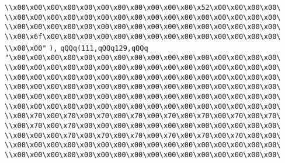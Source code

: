 \verb|\\x00\x00\x00\x00\x00\x00\x00\x00\x00\x00\x00\x52\x00\x00\x00\x00\|\newline
\verb|\\x00\x00\x00\x00\x00\x00\x00\x00\x00\x00\x00\x00\x00\x00\x00\x00\|\newline
\verb|\\x00\x00\x00\x00\x00\x00\x00\x00\x00\x00\x00\x00\x00\x00\x00\x00\|\newline
\verb|\\x00\x6f\x00\x00\x00\x00\x00\x00\x00\x00\x00\x00\x00\x00\x00\x00\|\newline
\verb|\\x00\x00"|\newline
\verb|),|\newline
\verb|qQQq(111,qQQq129,qQQq|\newline
\verb|"\x00\x00\x00\x00\x00\x00\x00\x00\x00\x00\x00\x00\x00\x00\x00\x00\|\newline
\verb|\\x00\x00\x00\x00\x00\x00\x00\x00\x00\x00\x00\x00\x00\x00\x00\x00\|\newline
\verb|\\x00\x00\x00\x00\x00\x00\x00\x00\x00\x00\x00\x00\x00\x00\x00\x00\|\newline
\verb|\\x00\x00\x00\x00\x00\x00\x00\x00\x00\x00\x00\x00\x00\x00\x00\x00\|\newline
\verb|\\x00\x00\x00\x00\x00\x00\x00\x00\x00\x00\x00\x00\x00\x00\x00\x00\|\newline
\verb|\\x00\x00\x00\x00\x00\x00\x00\x00\x00\x00\x00\x00\x00\x00\x00\x00\|\newline
\verb|\\x00\x70\x00\x70\x00\x70\x00\x70\x00\x70\x00\x70\x00\x70\x00\x70\|\newline
\verb|\\x00\x70\x00\x70\x00\x00\x00\x00\x00\x00\x00\x00\x00\x00\x00\x00\|\newline
\verb|\\x00\x00\x00\x70\x00\x70\x00\x70\x00\x70\x00\x70\x00\x70\x00\x00\|\newline
\verb|\\x00\x00\x00\x00\x00\x00\x00\x00\x00\x00\x00\x00\x00\x00\x00\x00\|\newline
\verb|\\x00\x00\x00\x00\x00\x00\x00\x00\x00\x00\x00\x00\x00\x00\x00\x00\|\newline
